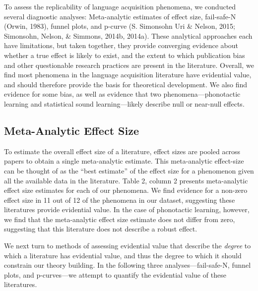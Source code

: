 \documentclass[english,floatsintext,man]{apa6}
\begin{document}
To assess the replicability of language acquisition phenomena, we
conducted several diagnostic analyses: Meta-analytic estimates of effect
size, fail-safe-N (Orwin, 1983), funnel plots, and p-curve (S. Simonsohn
Uri \& Nelson, 2015; Simonsohn, Nelson, \& Simmons, 2014b, 2014a). These
analytical approaches each have limitations, but taken together, they
provide converging evidence about whether a true effect is likely to
exist, and the extent to which publication bias and other questionable
research practices are present in the literature. Overall, we find most
phenomena in the language acquisition literature have evidential value,
and should therefore provide the basis for theoretical development. We
also find evidence for some bias, as well as evidence that two
phenomena---phonotactic learning and statistical sound learning---likely
describe null or near-null effects.

\subsection{Meta-Analytic Effect Size}\label{meta-analytic-effect-size}

To estimate the overall effect size of a literature, effect sizes are
pooled across papers to obtain a single meta-analytic estimate. This
meta-analytic effect-size can be thought of as the \enquote{best
estimate} of the effect size for a phenomenon given all the available
data in the literature. Table 2, column 2 presents meta-analytic effect
size estimates for each of our phenomena. We find evidence for a
non-zero effect size in 11 out of 12 of the phenomena in our dataset,
suggesting these literatures provide evidential value. In the case of
phonotactic learning, however, we find that the meta-analytic effect
size estimate does not differ from zero, suggesting that this literature
does not describe a robust effect.

We next turn to methods of assessing evidential value that describe the
\emph{degree} to which a literature has evidential value, and thus the
degree to which it should constrain our theory building. In the
following three analyses---fail-safe-N, funnel plots, and p-curves---we
attempt to quantify the evidential value of these literatures.
\end{document}
